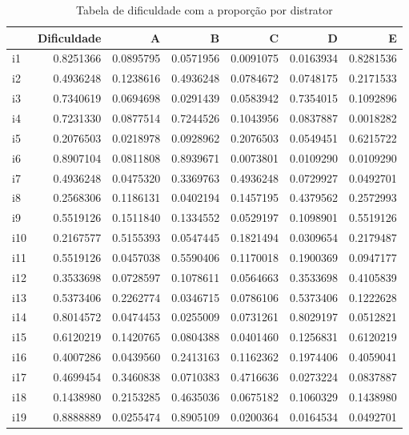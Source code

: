 \documentclass[]{article}
\begin{document}
\begin{table}[!h]

\caption{\label{tab:unnamed-chunk-1}Tabela de dificuldade com a proporção por distrator}
\centering
\begin{tabular}[t]{lrrrrrr}
\toprule
  & Dificuldade & A & B & C & D & E\\
\midrule
i1 & 0.8251366 & 0.0895795 & 0.0571956 & 0.0091075 & 0.0163934 & 0.8281536\\
i2 & 0.4936248 & 0.1238616 & 0.4936248 & 0.0784672 & 0.0748175 & 0.2171533\\
i3 & 0.7340619 & 0.0694698 & 0.0291439 & 0.0583942 & 0.7354015 & 0.1092896\\
i4 & 0.7231330 & 0.0877514 & 0.7244526 & 0.1043956 & 0.0837887 & 0.0018282\\
i5 & 0.2076503 & 0.0218978 & 0.0928962 & 0.2076503 & 0.0549451 & 0.6215722\\
\addlinespace
i6 & 0.8907104 & 0.0811808 & 0.8939671 & 0.0073801 & 0.0109290 & 0.0109290\\
i7 & 0.4936248 & 0.0475320 & 0.3369763 & 0.4936248 & 0.0729927 & 0.0492701\\
i8 & 0.2568306 & 0.1186131 & 0.0402194 & 0.1457195 & 0.4379562 & 0.2572993\\
i9 & 0.5519126 & 0.1511840 & 0.1334552 & 0.0529197 & 0.1098901 & 0.5519126\\
i10 & 0.2167577 & 0.5155393 & 0.0547445 & 0.1821494 & 0.0309654 & 0.2179487\\
\addlinespace
i11 & 0.5519126 & 0.0457038 & 0.5590406 & 0.1170018 & 0.1900369 & 0.0947177\\
i12 & 0.3533698 & 0.0728597 & 0.1078611 & 0.0564663 & 0.3533698 & 0.4105839\\
i13 & 0.5373406 & 0.2262774 & 0.0346715 & 0.0786106 & 0.5373406 & 0.1222628\\
i14 & 0.8014572 & 0.0474453 & 0.0255009 & 0.0731261 & 0.8029197 & 0.0512821\\
i15 & 0.6120219 & 0.1420765 & 0.0804388 & 0.0401460 & 0.1256831 & 0.6120219\\
\addlinespace
i16 & 0.4007286 & 0.0439560 & 0.2413163 & 0.1162362 & 0.1974406 & 0.4059041\\
i17 & 0.4699454 & 0.3460838 & 0.0710383 & 0.4716636 & 0.0273224 & 0.0837887\\
i18 & 0.1438980 & 0.2153285 & 0.4635036 & 0.0675182 & 0.1060329 & 0.1438980\\
i19 & 0.8888889 & 0.0255474 & 0.8905109 & 0.0200364 & 0.0164534 & 0.0492701\\

\end{tabular}
\end{table}
\end{document}
